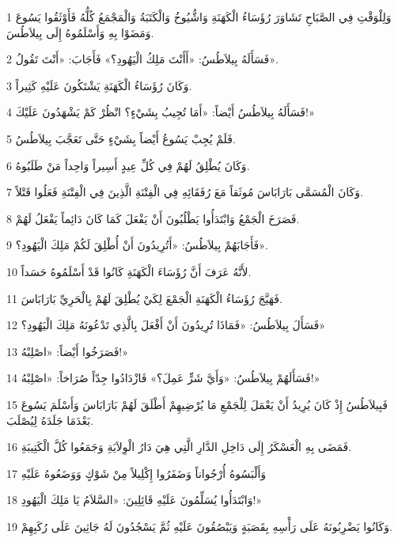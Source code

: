\par 1 وَلِلْوَقْتِ فِي الصَّبَاحِ تَشَاوَرَ رُؤَسَاءُ الْكَهَنَةِ وَاشُّيُوخُ وَالْكَتَبَةُ وَالْمَجْمَعُ كُلُّهُ فَأَوْثَقُوا يَسُوعَ وَمَضَوْا بِهِ وَأَسْلَمُوهُ إِلَى بِيلاَطُسَ.
\par 2 فَسَأَلَهُ بِيلاَطُسُ: «أَأَنْتَ مَلِكُ الْيَهُودِ؟» فَأَجَابَ: «أَنْتَ تَقُولُ».
\par 3 وَكَانَ رُؤَسَاءُ الْكَهَنَةِ يَشْتَكُونَ عَلَيْهِ كَثِيراً.
\par 4 فَسَأَلَهُ بِيلاَطُسُ أَيْضاً: «أَمَا تُجِيبُ بِشَيْءٍ؟ انْظُرْ كَمْ يَشْهَدُونَ عَلَيْكَ!»
\par 5 فَلَمْ يُجِبْ يَسُوعُ أَيْضاً بِشَيْءٍ حَتَّى تَعَجَّبَ بِيلاَطُسُ.
\par 6 وَكَانَ يُطْلِقُ لَهُمْ فِي كُلِّ عِيدٍ أَسِيراً وَاحِداً مَنْ طَلَبُوهُ.
\par 7 وَكَانَ الْمُسَمَّى بَارَابَاسَ مُوثَقاً مَعَ رُفَقَائِهِ فِي الْفِتْنَةِ الَّذِينَ فِي الْفِتْنَةِ فَعَلُوا قَتْلاً.
\par 8 فَصَرَخَ الْجَمْعُ وَابْتَدَأُوا يَطْلُبُونَ أَنْ يَفْعَلَ كَمَا كَانَ دَائِماً يَفْعَلُ لَهُمْ.
\par 9 فَأَجَابَهُمْ بِيلاَطُسُ: «أَتُرِيدُونَ أَنْ أُطْلِقَ لَكُمْ مَلِكَ الْيَهُودِ؟».
\par 10 لأَنَّهُ عَرَفَ أَنَّ رُؤَسَاءَ الْكَهَنَةِ كَانُوا قَدْ أَسْلَمُوهُ حَسَداً.
\par 11 فَهَيَّجَ رُؤَسَاءُ الْكَهَنَةِ الْجَمْعَ لِكَيْ يُطْلِقَ لَهُمْ بِالْحَرِيِّ بَارَابَاسَ.
\par 12 فَسَأَلَ بِيلاَطُسُ: «فَمَاذَا تُرِيدُونَ أَنْ أَفْعَلَ بِالَّذِي تَدْعُونَهُ مَلِكَ الْيَهُودِ؟»
\par 13 فَصَرَخُوا أَيْضاً: «اصْلِبْهُ!»
\par 14 فَسَأَلَهُمْ بِيلاَطُسُ: «وَأَيَّ شَرٍّ عَمِلَ؟» فَازْدَادُوا جِدّاً صُرَاخاً: «اصْلِبْهُ!»
\par 15 فَبِيلاَطُسُ إِذْ كَانَ يُرِيدُ أَنْ يَعْمَلَ لِلْجَمْعِ مَا يُرْضِيهِمْ أَطْلَقَ لَهُمْ بَارَابَاسَ وَأَسْلَمَ يَسُوعَ بَعْدَمَا جَلَدَهُ لِيُصْلَبَ.
\par 16 فَمَضَى بِهِ الْعَسْكَرُ إِلَى دَاخِلِ الدَّارِ الَّتِي هِيَ دَارُ الْوِلاَيَةِ وَجَمَعُوا كُلَّ الْكَتِيبَةِ.
\par 17 وَأَلْبَسُوهُ أُرْجُواناً وَضَفَرُوا إِكْلِيلاً مِنْ شَوْكٍ وَوَضَعُوهُ عَلَيْهِ
\par 18 وَابْتَدَأُوا يُسَلِّمُونَ عَلَيْهِ قَائِلِينَ: «السَّلاَمُ يَا مَلِكَ الْيَهُودِ!»
\par 19 وَكَانُوا يَضْرِبُونَهُ عَلَى رَأْسِهِ بِقَصَبَةٍ وَيَبْصُقُونَ عَلَيْهِ ثُمَّ يَسْجُدُونَ لَهُ جَاثِينَ عَلَى رُكَبِهِمْ.
